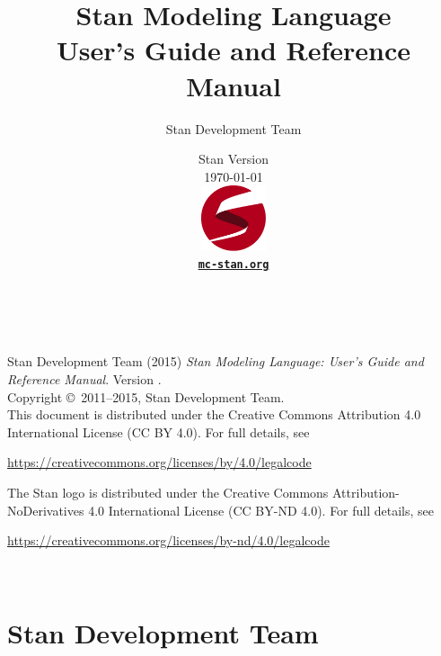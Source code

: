 \title{\Huge\bf Stan Modeling Language \\[4pt] {\LARGE User's Guide
    and Reference Manual}}
\author{Stan Development Team}

\date{\vspace*{36pt} Stan Version \stanversion
\\[8pt] {\small \today}
\\[36pt]
{
\vfill
\includegraphics[width=0.75in]{img/stanlogo-main.pdf}}
\\
\vspace*{6pt}
{\bfseries \href{http://mc-stan.org/}{\tt mc-stan.org}}
}
\maketitle

\newpage
\thispagestyle{empty}
\mbox{ }
\vfill
\begin{center}
\begin{minipage}[t]{0.75\textwidth}
\small
Stan Development Team (2015)
{\it Stan Modeling Language: User's Guide and Reference Manual}. Version
\stanversion.
\vspace*{20pt}
\mbox{ }
\\
Copyright \copyright \ 2011--2015, Stan Development Team.
\vspace*{28pt}
\mbox{} \\
This document is distributed under the Creative Commons Attribution 4.0
International License (CC BY 4.0).  For full details, see
\begin{center}
\url{https://creativecommons.org/licenses/by/4.0/legalcode}
\end{center}
The Stan logo is distributed under the Creative Commons Attribution-NoDerivatives
4.0 International License (CC BY-ND 4.0).  For full details, see
\begin{center}
\url{https://creativecommons.org/licenses/by-nd/4.0/legalcode}
\end{center}
\end{minipage}
\vspace*{24pt}
\mbox{ }
\end{center}

\newpage
\section*{Stan Development Team}

